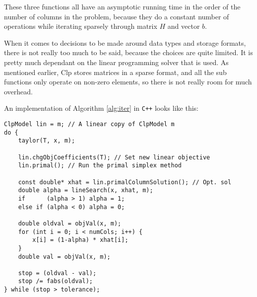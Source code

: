 These three functions all have an asymptotic running time in the order of the
number of columns in the problem, because they do a constant number of
operations while iterating sparsely through matrix $H$ and vector $b$.

When it comes to decisions to be made around data types and storage formats,
there is not really too much to be said, because the choices are quite limited.
It is pretty much dependant on the linear programming solver that is used.
As mentioned earlier, Clp stores matrices in a sparse format, and all the sub
functions only operate on non-zero elements, so there is not really room for
much overhead.

An implementation of Algorithm \ref{alg:iter} in \texttt{C++} looks like this:
\begin{verbatim}
ClpModel lin = m; // A linear copy of ClpModel m
do {
    taylor(T, x, m);

    lin.chgObjCoefficients(T); // Set new linear objective
    lin.primal(); // Run the primal simplex method
    
    const double* xhat = lin.primalColumnSolution(); // Opt. sol
    double alpha = lineSearch(x, xhat, m);
    if      (alpha > 1) alpha = 1;
    else if (alpha < 0) alpha = 0;

    double oldval = objVal(x, m);
    for (int i = 0; i < numCols; i++) {
        x[i] = (1-alpha) * xhat[i];
    }
    double val = objVal(x, m);

    stop = (oldval - val);
    stop /= fabs(oldval);
} while (stop > tolerance);
\end{verbatim}
